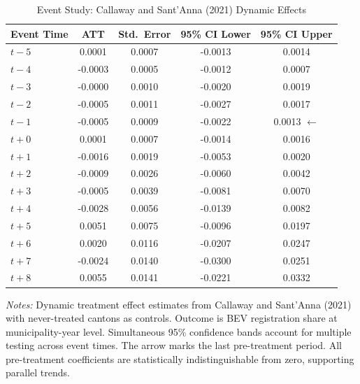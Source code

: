 \begin{table}[htbp]
\centering
\caption{Event Study: Callaway and Sant'Anna (2021) Dynamic Effects}
\label{tab:eventstudy}
\small
\begin{tabular}{lcccc}
\toprule
Event Time & ATT & Std.\ Error & 95\% CI Lower & 95\% CI Upper \\
\midrule
$t-5$ & 0.0001 & 0.0007 & -0.0013 & 0.0014 \\
$t-4$ & -0.0003 & 0.0005 & -0.0012 & 0.0007 \\
$t-3$ & -0.0000 & 0.0010 & -0.0020 & 0.0019 \\
$t-2$ & -0.0005 & 0.0011 & -0.0027 & 0.0017 \\
$t-1$ & -0.0005 & 0.0009 & -0.0022 & 0.0013 $\leftarrow$ \\
$t+0$ & 0.0001 & 0.0007 & -0.0014 & 0.0016 \\
$t+1$ & -0.0016 & 0.0019 & -0.0053 & 0.0020 \\
$t+2$ & -0.0009 & 0.0026 & -0.0060 & 0.0042 \\
$t+3$ & -0.0005 & 0.0039 & -0.0081 & 0.0070 \\
$t+4$ & -0.0028 & 0.0056 & -0.0139 & 0.0082 \\
$t+5$ & 0.0051 & 0.0075 & -0.0096 & 0.0197 \\
$t+6$ & 0.0020 & 0.0116 & -0.0207 & 0.0247 \\
$t+7$ & -0.0024 & 0.0140 & -0.0300 & 0.0251 \\
$t+8$ & 0.0055 & 0.0141 & -0.0221 & 0.0332 \\
\bottomrule
\end{tabular}
\begin{tablenotes}
\item \textit{Notes:} Dynamic treatment effect estimates from Callaway and Sant'Anna (2021) with never-treated cantons as controls. Outcome is BEV registration share at municipality-year level. Simultaneous 95\% confidence bands account for multiple testing across event times. The arrow marks the last pre-treatment period. All pre-treatment coefficients are statistically indistinguishable from zero, supporting parallel trends.
\end{tablenotes}
\end{table}
